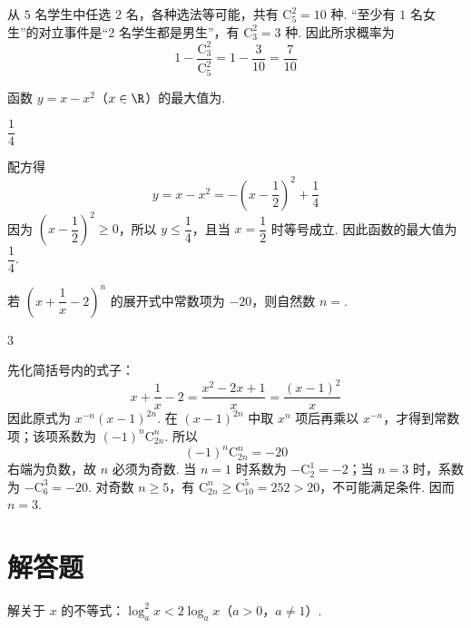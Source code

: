 \begin{solution}
从 \(5\) 名学生中任选 \(2\) 名，各种选法等可能，共有 \(\mathrm C_{5}^{2}=10\) 种. “至少有 \(1\) 名女生”的对立事件是“2 名学生都是男生”，有 \(\mathrm C_{3}^{2}=3\) 种. 因此所求概率为
\[
1-\frac{\mathrm C_{3}^{2}}{\mathrm C_{5}^{2}}=1-\frac3{10}=\frac7{10}
\]
\end{solution}

\begin{problem}
函数 \(y=x-x^{2}\)（\(x\in\R\)）的最大值为\fillinblank{}.
\end{problem}

\begin{answer}
\(\dfrac{1}{4}\)
\end{answer}

\begin{solution}
配方得
\[
y=x-x^{2}=-\left(x-\frac12\right)^{2}+\frac14
\]
因为 \(\left(x-\dfrac12\right)^2\geqslant0\)，所以 \(y\leqslant\dfrac14\)，且当 \(x=\dfrac12\) 时等号成立. 因此函数的最大值为 \(\dfrac14\).
\end{solution}

\begin{problem}
若 \(\left(x+\dfrac{1}{x}-2\right)^{n}\) 的展开式中常数项为 \(-20\)，则自然数 \(n=\)\fillinblank{}.
\end{problem}

\begin{answer}
\(3\)
\end{answer}

\begin{solution}
先化简括号内的式子：
\[
x+\frac1x-2=\frac{x^2-2x+1}{x}=\frac{(x-1)^2}{x}
\]
因此原式为 \(x^{-n}(x-1)^{2n}\). 在 \((x-1)^{2n}\) 中取 \(x^n\) 项后再乘以 \(x^{-n}\)，才得到常数项；该项系数为 \((-1)^n\mathrm C_{2n}^{n}\). 所以
\[
(-1)^n\mathrm C_{2n}^{n}=-20
\]
右端为负数，故 \(n\) 必须为奇数. 当 \(n=1\) 时系数为 \(-\mathrm C_2^1=-2\)；当 \(n=3\) 时，系数为 \(-\mathrm C_6^3=-20\). 对奇数 \(n\geqslant5\)，有 \(\mathrm C_{2n}^{n}\geqslant\mathrm C_{10}^{5}=252>20\)，不可能满足条件. 因而 \(n=3\).
\end{solution}

\section{解答题}

\begin{problem}
解关于 \(x\) 的不等式：\(\log_a^2x<2\log_{a}x\)（\(a>0\)，\(a\neq1\)）.
\end{problem}

